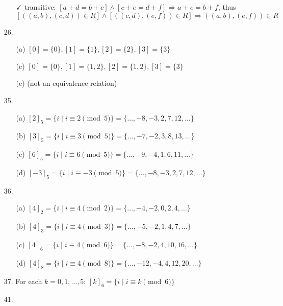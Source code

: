 \documentclass{article}
\begin{document}
\begin{enumerate}
\begin{itemize}
\[            \]
            \item[$\checkmark$] transitive: $[a+d = b+c] \land [c+e = d+f] \Rightarrow a+e = b+f$, thus
            \[
            [((a,b),(c,d)) \in R] \land [((c,d),(e,f)) \in R] \Rightarrow ((a,b),(e,f)) \in R
            \]
        \end{itemize}
    \item[26.]
        \begin{itemize}
            \item[(a)] $[0] = \{ 0 \}, [1] = \{ 1 \}, [2] = \{ 2 \}, [3] = \{ 3 \}$
            \item[(c)] $[0] = \{ 0 \}, [1] = \{ 1, 2 \}, [2] = \{ 1, 2 \}, [3] = \{ 3 \}$
            \item[(e)] (not an equivalence relation)
        \end{itemize}
    \item[35.]
        \begin{itemize}
            \item[(a)] $[2]_{5} = \{ i \mid i \equiv 2 \pmod 5 \} = \{ \ldots, -8, -3, 2, 7, 12, \ldots \}$
            \item[(b)] $[3]_{5} = \{ i \mid i \equiv 3 \pmod 5 \} = \{ \ldots, -7, -2, 3, 8, 13, \ldots \}$
            \item[(c)] $[6]_{5} = \{ i \mid i \equiv 6 \pmod 5 \} = \{ \ldots, -9, -4, 1, 6, 11, \ldots \}$
            \item[(d)] $[-3]_{5} = \{ i \mid i \equiv -3 \pmod 5 \} = \{ \ldots, -8, -3, 2, 7, 12, \ldots \}$
        \end{itemize}
    \item[36.]
        \begin{itemize}
            \item[(a)] $[4]_{2} = \{ i \mid i \equiv 4 \pmod 2 \} = \{ \ldots, -4, -2, 0, 2, 4, \ldots \}$
            \item[(b)] $[4]_{3} = \{ i \mid i \equiv 4 \pmod 3 \} = \{ \ldots, -5, -2, 1, 4, 7, \ldots \}$
            \item[(c)] $[4]_{6} = \{ i \mid i \equiv 4 \pmod 6 \} = \{ \ldots, -8, -2, 4, 10, 16, \ldots \}$
            \item[(d)] $[4]_{8} = \{ i \mid i \equiv 4 \pmod 8 \} = \{ \ldots, -12, -4, 4, 12, 20, \ldots \}$
        \end{itemize}
    \item[37.] For each $k = 0, 1, \ldots, 5$: $[k]_{6} = \{ i \mid i \equiv k \pmod 6 \}$
    \item[41.]

\end{enumerate}
\end{document}
